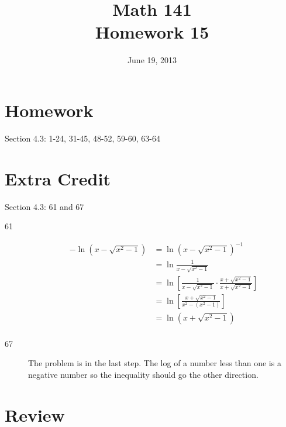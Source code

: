 \documentclass{exam}
\date{June 19, 2013}
\author{}
\title{Math 141 \\ Homework 15}
\begin{document}
  \maketitle

  \section{Homework}

  Section 4.3: 1-24, 31-45, 48-52, 59-60, 63-64

  \ifprintanswers
    \pagebreak
  \fi

  \section{Extra Credit}
  Section 4.3: 61 and 67

  \ifprintanswers
    \begin{description}
      \item[61]
        \begin{align*}
          - \ln(x - \sqrt{x^2 - 1}) &= \ln(x - \sqrt{x^2 - 1})^{-1} \\
                                    &= \ln \frac{1}{x - \sqrt{x^2 - 1}} \\
                                    &= \ln \left[ \frac{1}{x - \sqrt{x^2 - 1}} \cdot \frac{x + \sqrt{x^2 - 1}}{x + \sqrt{x^2 - 1}} \right] \\
                                    &= \ln \left[ \frac{x + \sqrt{x^2 - 1}}{x^2 - (x^2 - 1)} \right] \\
                                    &= \ln ( x + \sqrt{x^2 - 1} ) \\
        \end{align*}

      \item[67]
        The problem is in the last step.  The log of a number less than one is a negative number so the inequality should go the other direction.

    \end{description}
  \fi

  \ifprintanswers
    \pagebreak
  \fi

  \section{Review}
\end{document}
